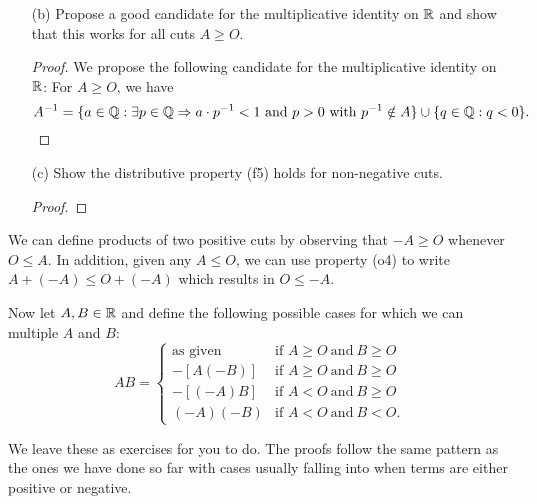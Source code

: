 \begin{enumerate}
\begin{proof}
    Now we need to show that  property \( (o5)   \) holds for \( AB \). Assume \( A \geq O  \) and \( B \geq O  \). We know that \( O \subseteq A   \) and \(  O \subseteq B  \). This means that if we let \(  p, w \in O  \), then \( p, w \in A  \) and \( p, w  \in B  \). Note that \( p \cdot w < 0   \). Since \( ab \geq 0  \), we know that \( pw \leq ab  \) which implies that \( pw \in AB \) and hence, \( O \subseteq AB \).
        \end{proof}
    \item[(b)] Propose a good candidate for the multiplicative identity on \( \mathbb{R}  \) and show that this works for all cuts \( A \geq O  \).
        \begin{proof}
        We propose the following candidate for the multiplicative identity on \( \mathbb{R}  \): For \( A \geq O  \), we have 
        \[  A^{-1} =  \{ a \in \Q : \exists p \in \Q \implies a \cdot p^{-1} < 1 \ \text{and } p > 0 \ \text{with} \ p^{-1} \notin A   \} \cup \{ q \in \Q : q < 0  \}. \] 
        \end{proof}
    \item[(c)] Show the distributive property (f5) holds for non-negative cuts.
        \begin{proof}
        
        \end{proof}
\end{enumerate}

We can define products of two positive cuts by observing that \( -A \geq O  \) whenever \( O \leq A  \). In addition, given any \( A \leq O  \), we can use property (o4) to write \( A + (-A) \leq O + (-A) \) which results in \( O \leq -A  \). 

Now let \( A, B \in \mathbb{R}  \) and define the following possible cases for which we can multiple \( A  \) and \( B  \): 
\[  AB = 
\begin{cases}
    \text{as given} &\text{if } A \geq O \ \text{and} \ B \geq O \\
      -[A(-B)] &\text{if } A \geq O \ \text{and} \ B \geq O  \\
      -[(-A)B] &\text{if } A < O  \ \text{and} \ B \geq  O  \\
      (-A)(-B) &\text{if } A < O \ \text{and} \  B < O.
\end{cases} \]

We leave these as exercises for you to do. The proofs follow the same pattern as the ones we have done so far with cases usually falling into when terms are either positive or negative.

